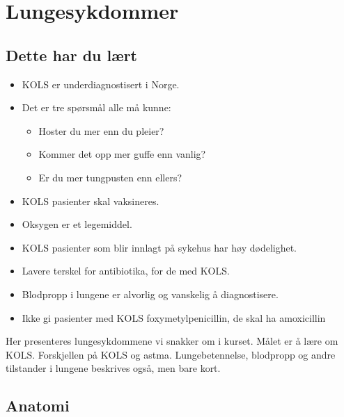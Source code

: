 \chapter{Lungesykdommer}
		\section{Dette har du lært}
			\begin{itemize}
				\item KOLS er underdiagnostisert i Norge.\\
				\item Det er tre spørsmål alle må kunne\cite{anthonisen}:\\
					\begin{itemize}
						\item Hoster du mer enn du pleier?\\
						\item Kommer det opp mer guffe enn vanlig?\\
						\item Er du mer tungpusten enn ellers?\\
					\end{itemize}
				\item KOLS pasienter skal vaksineres.\\
				\item Oksygen er et legemiddel.\\
				\item KOLS pasienter som blir innlagt på sykehus har høy dødelighet.\\
				\item Lavere terskel for antibiotika, for de med KOLS.\\
				\item Blodpropp i lungene er alvorlig og vanskelig å diagnostisere.\\
				\item Ikke gi pasienter med KOLS foxymetylpenicillin, de skal ha amoxicillin\\
			\end{itemize}Her presenteres lungesykdommene vi snakker om i kurset. Målet er å lære om KOLS. Forskjellen på KOLS og astma. Lungebetennelse, blodpropp og andre tilstander i lungene beskrives også, men bare kort.
		\section{Anatomi}
